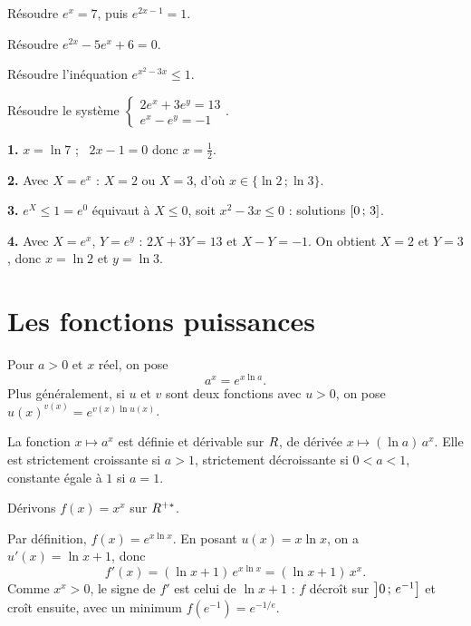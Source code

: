 \begin{entrainement}
\exo[\niveau{1}] Résoudre $e^{x} = 7$, puis $e^{2x-1} = 1$.

\exo[\niveau{2}] Résoudre $e^{2x} - 5e^{x} + 6 = 0$.

\exo[\niveau{2}] Résoudre l'inéquation $e^{x^{2}-3x} \leq 1$.

\exo[\niveau{3}] Résoudre le système
$\begin{cases} 2e^{x} + 3e^{y} = 13 \\ e^{x} - e^{y} = -1 \end{cases}$.
\end{entrainement}

\begin{corrige}
\textbf{1.} $x = \ln 7$ ; \ $2x-1 = 0$ donc $x = \tfrac12$.

\textbf{2.} Avec $X = e^{x}$ : $X = 2$ ou $X = 3$, d'où
$x \in \{\ln 2\,;\ln 3\}$.

\textbf{3.} $e^{X} \leq 1 = e^{0}$ équivaut à $X \leq 0$, soit
$x^{2}-3x \leq 0$ : solutions $\left[0\,;\,3\right]$.

\textbf{4.} Avec $X = e^{x}$, $Y = e^{y}$ : $2X+3Y = 13$ et $X-Y = -1$. On
obtient $X = 2$ et $Y = 3$, donc $x = \ln 2$ et $y = \ln 3$.
\end{corrige}

\section{Les fonctions puissances}

\begin{definition}
Pour $a>0$ et $x$ réel, on pose
\[
  a^{x} = e^{x\ln a}.
\]
Plus généralement, si $u$ et $v$ sont deux fonctions avec $u>0$, on pose
$u(x)^{v(x)} = e^{v(x)\ln u(x)}$.
\end{definition}

\begin{propriete}
La fonction $x \mapsto a^{x}$ est définie et dérivable sur $R$, de dérivée
$x \mapsto (\ln a)\,a^{x}$. Elle est strictement croissante si $a>1$,
strictement décroissante si $0<a<1$, constante égale à $1$ si $a = 1$.
\end{propriete}

\begin{exemple}
Dérivons $f(x) = x^{x}$ sur $R^{+*}$.

Par définition, $f(x) = e^{x\ln x}$. En posant $u(x) = x\ln x$, on a
$u'(x) = \ln x + 1$, donc
\[
  f'(x) = (\ln x + 1)\,e^{x\ln x} = (\ln x + 1)\,x^{x}.
\]
Comme $x^{x}>0$, le signe de $f'$ est celui de $\ln x + 1$ : $f$ décroît sur
$\left]0\,;\,e^{-1}\right]$ et croît ensuite, avec un minimum
$f(e^{-1}) = e^{-1/e}$.
\end{exemple}

